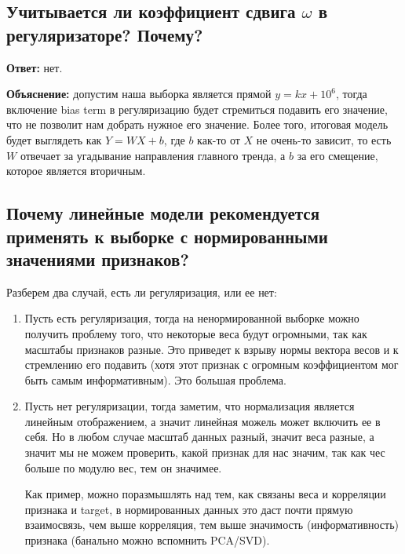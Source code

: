 \subsection{Учитывается ли коэффициент сдвига $\omega$ в регуляризаторе? Почему?}

\textbf{Ответ:} нет.

\textbf{Объяснение:} допустим наша выборка является прямой $y = kx + 10^6$, тогда включение bias term в регуляризацию будет стремиться подавить его значение, что не позволит нам добрать нужное его значение. Более того, итоговая модель будет выглядеть как $Y = WX + b$, где $b$ как-то от $X$ не очень-то зависит, то есть $W$ отвечает за угадывание направления главного тренда, а $b$ за его смещение, которое является вторичным.








\subsection{Почему линейные модели рекомендуется применять к выборке с нормированными значениями признаков?}

Разберем два случай, есть ли регуляризация, или ее нет:
\begin{enumerate}
    \item Пусть есть регуляризация, тогда на ненормированной выборке можно получить проблему того, что некоторые веса будут огромными, так как масштабы признаков разные. Это приведет к взрыву нормы вектора весов и к стремлению его подавить (хотя этот признак с огромным коэффициентом мог быть самым информативным). Это большая проблема.
    \item Пусть нет регуляризации, тогда заметим, что нормализация является линейным отображением, а значит линейная можель может включить ее в себя. Но в любом случае масштаб данных разный, значит веса разные, а значит мы не можем проверить, какой признак для нас значим, так как чес больше по модулю вес, тем он значимее. 
    
    Как пример, можно поразмышлять над тем, как связаны веса и корреляции признака и target, в нормированных данных это даст почти прямую взаимосвязь, чем выше корреляция, тем выше значимость (информативность) признака (банально можно вспомнить PCA/SVD).
\end{enumerate}











